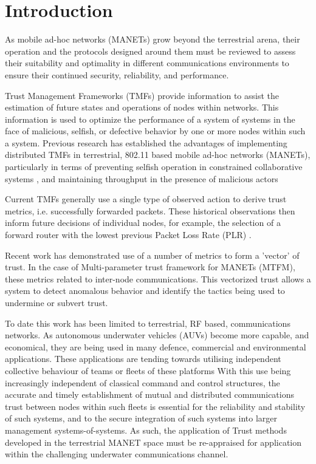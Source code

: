 \documentclass[runningheads,a4paper]{llncs}
\begin{document}
\section{Introduction}\label{sec:introduction}

As mobile ad-hoc networks (MANETs) grow beyond the terrestrial arena, their operation and the protocols designed around them must be reviewed to assess their suitability and optimality in different communications environments to ensure their continued security, reliability, and performance.

Trust Management Frameworks (TMFs) provide information to assist the estimation of future states and operations of nodes within networks.
This information is used to optimize the performance of a system of systems in the face of malicious, selfish, or defective behavior by one or more nodes within such a system.
Previous research has established the advantages of implementing distributed TMFs in terrestrial, 802.11 based mobile ad-hoc networks (MANETs), particularly in terms of preventing selfish operation in constrained collaborative systems \cite{Li2007}, and maintaining throughput in the presence of malicious actors \cite{Buchegger2002}

Current TMFs generally use a single type of observed action to derive trust metrics, i.e. successfully forwarded packets. These historical observations then inform future decisions of individual nodes, for example, the selection of a forward router with the lowest previous Packet Loss Rate (PLR) \cite{Li2008}.

Recent work has demonstrated use of a number of metrics to form a 'vector’ of trust.
In the case of Multi-parameter trust framework for MANETs (MTFM)\cite{Guo2012}, these metrics related to inter-node communications.
This vectorized trust allows a system to detect anomalous behavior and identify the tactics being used to undermine or subvert trust.

To date this work has been limited to terrestrial, RF based, communications networks.
As autonomous underwater vehicles (AUVs) become more capable, and economical, they are being used in many defence, commercial and environmental applications.
These applications are tending towards utilising  independent collective behaviour of teams or fleets of these platforms \cite{Caiti2011}
With this use being increasingly independent of classical command and control structures, the accurate and timely establishment of mutual and distributed communications trust between nodes within such fleets is essential for the reliability and stability of such systems, and to the secure integration of such systems into larger management systems-of-systems.
As such, the application of Trust methods developed in the terrestrial MANET space must be re-appraised for application within the challenging underwater communications channel.
\end{document}
